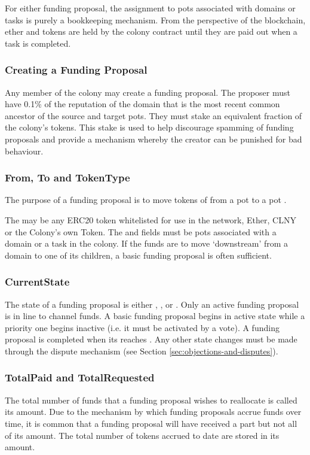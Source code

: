 For either funding proposal, the assignment to pots associated with domains or tasks is purely a bookkeeping mechanism. From the perspective of the blockchain, ether and tokens are held by the colony contract until they are paid out when a task is completed.

\subsubsection{Creating a Funding Proposal}
Any member of the colony may create a funding proposal. The proposer must have 0.1\% of the reputation of the domain that is the most recent common ancestor of the source and target pots. They must stake an equivalent fraction of the colony's tokens. This stake is used to help discourage spamming of funding proposals and provide a mechanism whereby the creator can be punished for bad behaviour.

\subsubsection{From, To and TokenType}
The purpose of a funding proposal is to move tokens of  from a pot  to a pot .

The  may be any ERC20 token whitelisted for use in the network, Ether, CLNY or the Colony's own Token. The  and  fields must be pots associated with a domain or a task in the colony. If the funds are to move `downstream' from a domain to one of its children, a basic funding proposal is often sufficient.

\subsubsection{CurrentState}
The state of a funding proposal is either , ,  or . Only an active funding proposal is in line to channel funds. A basic funding proposal begins in active state while a priority one begins inactive (i.e. it must be activated by a vote). A funding proposal is completed when its  reaches . Any other state changes must be made through the dispute mechanism (see Section \ref{sec:objections-and-disputes}).

\subsubsection{TotalPaid and TotalRequested}
The total number of funds that a funding proposal wishes to reallocate is called its  amount. Due to the mechanism by which funding proposals accrue funds over time, it is common that a funding proposal will have received a part but not all of its  amount. The total number of tokens accrued to date are stored in its  amount.

